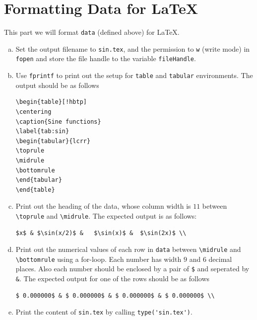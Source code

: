\section{Formatting Data for \LaTeX{}}
This part we will format \verb|data| (defined above) for \LaTeX{}.
\begin{enumerate}[(a)]
    \item Set the output filename to \verb|sin.tex|, and the permission to \verb|w| (write mode) in \verb|fopen| and store the file handle to the variable \verb|fileHandle|.
    \item Use \verb|fprintf| to print out the setup for \verb|table| and \verb|tabular| environments. The output should be as follows
        \begin{lstlisting}[style=TeX]
\begin{table}[!hbtp]
\centering
\caption{Sine functions}
\label{tab:sin}
\begin{tabular}{lcrr}
\toprule
\midrule
\bottomrule
\end{tabular}
\end{table}
        \end{lstlisting}
    \item Print out the heading of the data, whose column width is $11$ between \verb|\toprule| and \verb|\midrule|. The expected output is as follows:
        \begin{lstlisting}[style=TeX]
        $x$ & $\sin(x/2)$ &   $\sin(x)$ &  $\sin(2x)$ \\
        \end{lstlisting}
    \item Print out the numerical values of each row in \verb|data| between \verb|\midrule| and \verb|\bottomrule| using a for-loop. Each number has width $9$ and $6$ decimal places. Also each number should be enclosed by a pair of \verb|$| and seperated by \verb|&|. The expected output for one of the rows should be as follows
        \begin{lstlisting}[style=TeX]
$ 0.000000$ & $ 0.000000$ & $ 0.000000$ & $ 0.000000$ \\
        \end{lstlisting}
    \item Print the content of \verb|sin.tex| by calling \verb|type('sin.tex')|.
\end{enumerate}
